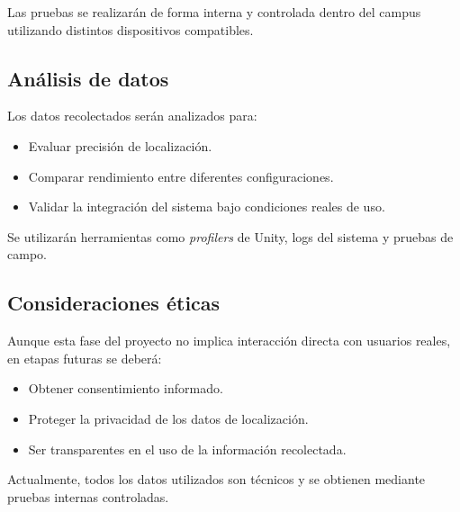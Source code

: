 \documentclass{article}
\begin{document}
Las pruebas se realizarán de forma interna y controlada dentro del campus utilizando distintos dispositivos compatibles.

\subsection{Análisis de datos}

Los datos recolectados serán analizados para:

\begin{itemize}
    \item Evaluar precisión de localización.
    \item Comparar rendimiento entre diferentes configuraciones.
    \item Validar la integración del sistema bajo condiciones reales de uso.
\end{itemize}

Se utilizarán herramientas como \textit{profilers} de Unity, logs del sistema y pruebas de campo.

\subsection{Consideraciones éticas}

Aunque esta fase del proyecto no implica interacción directa con usuarios reales, en etapas futuras se deberá:

\begin{itemize}
    \item Obtener consentimiento informado.
    \item Proteger la privacidad de los datos de localización.
    \item Ser transparentes en el uso de la información recolectada.
\end{itemize}

Actualmente, todos los datos utilizados son técnicos y se obtienen mediante pruebas internas controladas.
\end{document}
